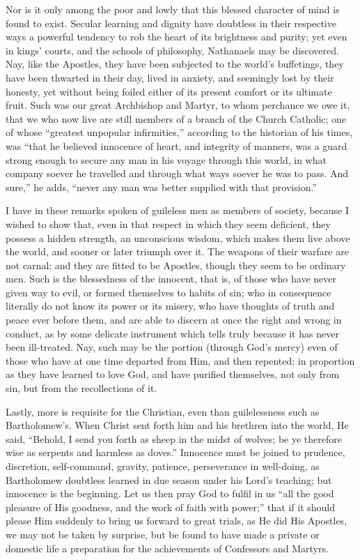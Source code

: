 Nor is it only among the poor and lowly that this blessed character
of mind is found to exist. Secular learning and dignity have doubtless
in their respective ways a powerful tendency to rob the heart of its
brightness and purity; yet even in kings' courts, and the schools of
philosophy, Nathanaels may be discovered. Nay, like the Apostles, they
have been subjected to the world's buffetings, they have been thwarted
in their day, lived in anxiety, and seemingly lost by their honesty, yet
without being foiled either of its present comfort or its ultimate
fruit. Such was our great Archbishop and Martyr, to whom perchance we
owe it, that we who now live are still members of a branch of the Church
Catholic; one of whose ``greatest unpopular infirmities,''
according to the historian of his times, was ``that he believed
innocence of heart, and integrity of manners, was a guard strong enough
to secure any man in his voyage through this world, in what company
soever he travelled and through what ways soever he was to pass. And
sure,'' he adds, ``never any man was better supplied with that
provision.''

I have in these remarks spoken of guileless men as members of
society, because I wished to show that, even in that respect in which
they seem deficient, they possess a hidden strength, an unconscious
wisdom, which makes them live above the world, and sooner or later
triumph over it. The weapons of their warfare are not carnal; and they
are fitted to be Apostles, though they seem to be ordinary men. Such is
the blessedness of the innocent, that is, of those who have never given
way to evil, or formed themselves to habits of sin; who in consequence
literally do not know its power or its misery, who have thoughts of truth
and peace ever before them, and are able to discern at once the right
and wrong in conduct, as by some delicate instrument which tells truly
because it has never been ill-treated. Nay, such may be the portion
(through God's mercy) even of those who have at one time departed from
Him, and then repented; in proportion as they have learned to love God,
and have purified themselves, not only from sin, but from the
recollections of it.

Lastly, more is requisite for the Christian, even than guilelessness
such as Bartholomew's. When Christ sent forth him and his brethren into
the world, He said, ``Behold, I send you forth as sheep in the midst
of wolves; be ye therefore wise as serpents and harmless as doves.''
Innocence must be joined to prudence, discretion, self-command, gravity,
patience, perseverance in well-doing, as Bartholomew doubtless learned
in due season under his Lord's teaching; but innocence is the beginning.
Let us then pray God to fulfil in us ``all the good pleasure of His
goodness, and the work of faith with power;'' that if it should
please Him suddenly to bring us forward to great trials, as He did His
Apostles, we may not be taken by surprise, but be found to have made a
private or domestic life a preparation for the achievements of
Confessors and Martyrs.

